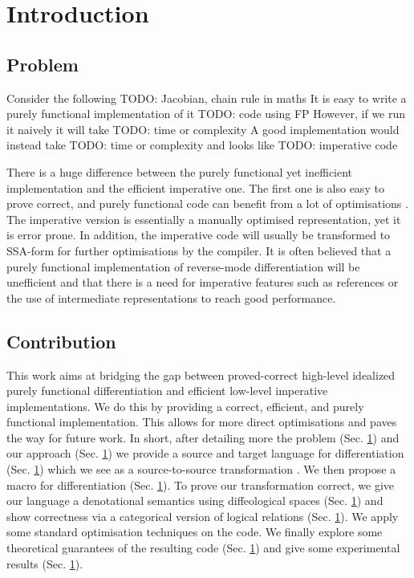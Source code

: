 \section{Introduction}

\subsection{Problem} %
\label{sub:problem}

Consider the following 
TODO: Jacobian, chain rule in maths
It is easy to write a purely functional implementation of it
TODO: code using FP
However, if we run it naively it will take 
TODO: time or complexity
A good implementation would instead take
TODO: time or complexity
and looks like
TODO: imperative code

There is a huge difference between the purely functional yet inefficient implementation and the efficient imperative one. The first one is also easy to prove correct, and purely functional code can benefit from a lot of optimisations \cite{}. The imperative version is essentially a manually optimised representation, yet it is error prone. In addition, the imperative code will usually be transformed to SSA-form \cite{} for further optimisations by the compiler. It is often believed \cite{} that a purely functional implementation of reverse-mode differentiation will be unefficient and that there is a need for imperative features such as references or the use of intermediate representations \cite{} to reach good performance.

\subsection{Contribution} %
\label{sub:contribution}



This work aims at bridging the gap between proved-correct high-level idealized purely functional differentiation and efficient low-level imperative implementations.  We do this by providing a correct, efficient, and purely functional implementation. This allows for more direct optimisations and paves the way for future work. In short, after detailing more the problem (Sec. \ref{}) and our approach (Sec. \ref{}) we provide a source and target language for differentiation (Sec. \ref{}) which we see as a source-to-source transformation \cite{}. We then propose a macro for differentiation (Sec. \ref{}). To prove our transformation correct, we give our language a denotational semantics using diffeological spaces (Sec. \ref{}) and show correctness via a categorical version of logical relations (Sec. \ref{}). We apply some standard optimisation techniques on the code.
We finally explore some theoretical guarantees of the resulting code (Sec. \ref{}) and give some experimental results (Sec. \ref{}). 

